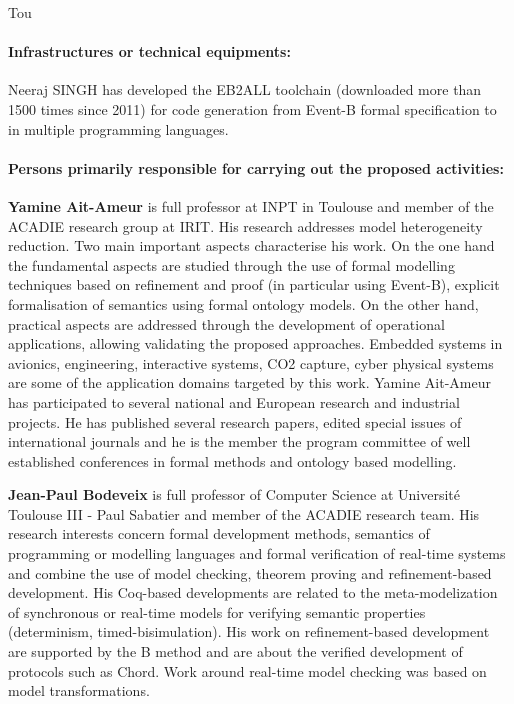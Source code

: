 \begin{sitedescription}{Tou}
\paragraph*{Infrastructures or technical equipments:}

\begin{compactitem}
\item Neeraj SINGH  has  developed the EB2ALL toolchain (downloaded more than 1500 times since 2011)  for code generation  from Event-B formal specification to in multiple programming languages.
\end{compactitem}

\paragraph*{Persons primarily responsible for carrying out the proposed activities:}

\begin{compactitem} %

\item{\bf   Yamine Ait-Ameur}    is full professor at INPT in Toulouse and member of the ACADIE research group at IRIT. 
 His research addresses model heterogeneity reduction. Two main important aspects characterise his work. On the one hand the fundamental aspects are studied through the use of formal modelling techniques based on refinement and proof (in particular using Event-B), explicit formalisation of semantics using formal ontology models. On the other hand, practical aspects are addressed through the development of operational applications, allowing validating the proposed approaches. Embedded systems in avionics, engineering, interactive systems, CO2 capture, cyber physical systems are some of the application domains targeted by this work.  
Yamine Ait-Ameur has participated to several national and European research and industrial projects.   He has published several research papers, edited special issues of international journals and he is the member the program committee of well established conferences in formal methods and ontology based modelling.

\item{\bf  Jean-Paul Bodeveix} is full professor of Computer Science at Universit\'e Toulouse III - Paul Sabatier  and member of the ACADIE research team. His research interests concern formal development
methods, semantics of programming or modelling languages and formal verification of real-time systems and combine the use of model checking, theorem proving and refinement-based development. His Coq-based developments are related to the meta-modelization of synchronous or real-time models for verifying semantic properties (determinism, timed-bisimulation). His work on refinement-based development are supported by the B method and are about the verified development of protocols such as Chord. Work around real-time model checking was based on model transformations.


\end{compactitem}
\end{sitedescription}
